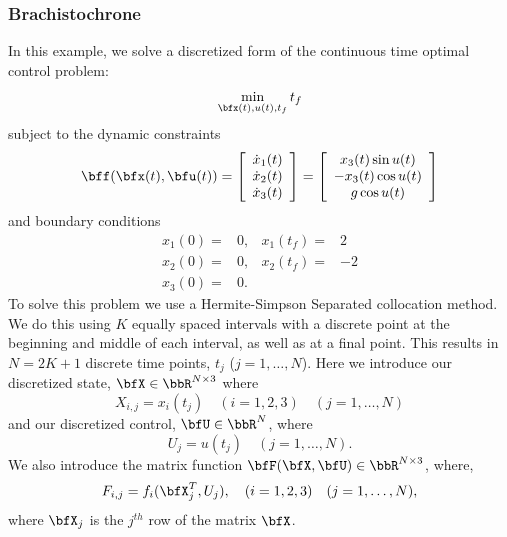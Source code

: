 \documentclass[10pt,pdftex]{article}
\begin{document}
\subsubsection{Brachistochrone}
In this example, we solve a discretized form of the continuous time optimal control problem:
\begin{equation}
\min\limits_{\bfx(t),u(t),t_f} t_f
\end{equation}
subject to the dynamic constraints
\begin{equation}\label{brachcontdynamics}
\bff(\bfx(t),\bfu(t)) = 
\left[ \begin{array}{c}
\dot{x}_1(t) \\ \dot{x}_2(t)\\ \dot{x}_3(t)
\end{array} \right] = 
\left[ \begin{array}{c}
x_3(t) \sin u(t)\\
-x_3(t) \cos u(t) \\
g \cos u(t)
\end{array} \right]
\end{equation}
and boundary conditions
\begin{equation}\label{brachcontbound}
\begin{array}{rrrr}
x_1(0) = & 0, & x_1(t_f) = & 2 \\
x_2(0) = & 0, & x_2(t_f) = & -2 \\
x_3(0) = & 0. & & 
\end{array}
\end{equation}
To solve this problem we use a Hermite-Simpson Separated collocation method. We do this using $K$ equally spaced intervals with a discrete point at the beginning and middle of each interval, as well as at a final point. This results in $N = 2K+1$ discrete time points, $t_j$ ($j = 1,\dots,N$). Here we introduce our discretized state, $\bfX \in \bbR^{N \times 3}$ where
\begin{equation}
X_{i,j} = x_i(t_j) \quad (i = 1,2,3) \quad	 (j = 1,\dots,N)
\end{equation}
and our discretized control, $\bfU \in \bbR^N$, where
\begin{equation}
U_j = u(t_j) \quad (j = 1,\dots,N).
\end{equation}
We also introduce the matrix function $\bfF(\bfX,\bfU) \in \bbR^{N \times 3}$, where,
\begin{equation}
F_{i,j} = f_i(\bfX_j^T,U_j), \quad (i = 1,2,3) \quad (j = 1,\dots,N),
\end{equation}
where $\bfX_j$ is the $j^{th}$ row of the matrix $\bfX$. 
\end{document}
